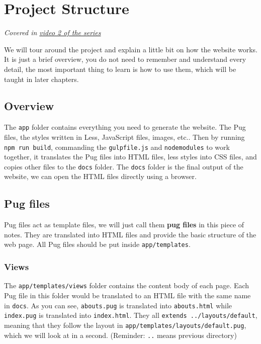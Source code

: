 \chapter{Project Structure}
\label{sec:projstructure}

\textit{Covered in \href{https://www.youtube.com/watch?v=fbbjnhs4nyo&list=PLjGmdnqrOKuYXiu7lgG5HW71jPEUd1XCm&index=3}{video 2 of the series}}
\vspace{6mm}

We will tour around the project and explain a little bit on how the website works. It is just a brief overview, you do not need to remember and understand every detail, the most important thing to learn is how to use them, which will be taught in later chapters.

\section{Overview}

The \texttt{app} folder contains everything you need to generate the website. The Pug files, the styles written in Less, JavaScript files, images, etc.. Then by running \texttt{npm run build}, commanding the \texttt{gulpfile.js} and \texttt{node\textunderscore modules} to work together, it translates the Pug files into HTML files, less styles into CSS files, and copies other files to the \texttt{docs} folder. The \texttt{docs} folder is the final output of the website, we can open the HTML files directly using a browser.

\section{Pug files}

Pug files act as template files, we will just call them \textbf{pug files} in this piece of notes. They are translated into HTML files and provide the basic structure of the web page. All Pug files should be put inside \texttt{app/templates}.

\subsection*{Views}

The \texttt{app/templates/views} folder contains the content body of each page. Each Pug file in this folder would be translated to an HTML file with the same name in \texttt{docs}. As you can see, \texttt{abouts.pug} is translated into \texttt{abouts.html} while \texttt{index.pug} is translated into \texttt{index.html}. They all \texttt{extends ../layouts/default}, meaning that they follow the layout in \texttt{app/templates/layouts/default.pug}, which we will look at in a second. (Reminder: \texttt{..} means previous directory)

